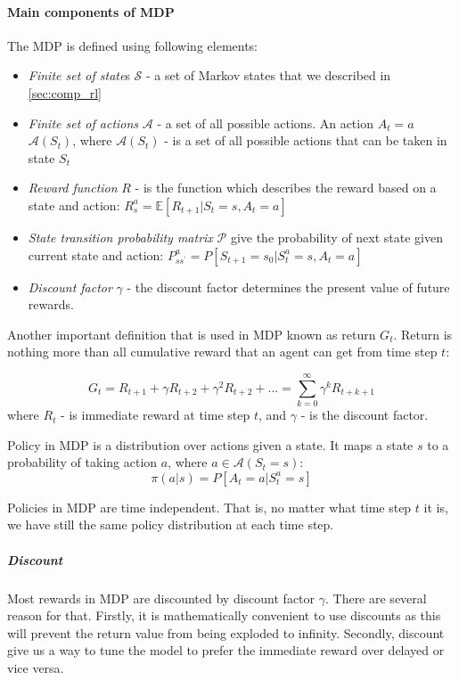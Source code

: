 \paragraph{Main components of MDP} The MDP is defined using following elements:
\begin{itemize}
	\item \emph{Finite set of state}s $\mathcal{S}$ - a set of Markov states that we described in \autoref{sec:comp_rl}
	\item \emph{Finite set of actions} $\mathcal{A}$ - a set of all possible actions.
		An action $A_t = a$ \in $\mathcal{A}(S_t)$, where $\mathcal{A}(S_t)$ -
		is a set of all possible actions that can be taken in state $S_t$
	\item \emph{Reward function} $R$ - is the function which describes
		the reward based on a state and action: $R_s^a = \mathbb{E}[R_{t+1}| S_t = s, A_t = a]$
	\item \emph{State transition probability matrix} $\mathcal{P}$ give
		the probability of next state given current state and action: $P^a_{ss^{\prime}} = P[S_{t+1} = s_0 | S_t^a = s, A_t = a]$
	\item \emph{Discount factor} $\gamma$ - the discount factor determines the present value
	 	of future rewards.
\end{itemize}

Another important definition that is used in MDP known as return $G_t$. Return is nothing
more than all cumulative reward that an agent can get from time step $t$:

\begin{equation} \label{eq:return}
	G_t = R_{t+1} + \gamma R_{t+2} + \gamma^2 R_{t+2} + ... = \sum_{k=0}^{\infty} \gamma^k R_{t+k+1}
\end{equation}
where $R_t$ - is immediate reward at time step $t$,
and $\gamma$ - is the discount factor.

Policy in MDP is a distribution over actions given a state.
It maps a state $s$ to a probability of taking action $a$, where $a \in \mathcal{A}(S_t = s)$:
\begin{equation}
	\pi(a|s) = P[A_t = a|S_t^a = s]
\end{equation}

Policies in MDP are time independent. That is, no matter what time step $t$ it is, we have still the same
policy distribution at each time step.

\subparagraph{Discount} Most rewards in MDP are discounted by discount factor $\gamma$.
There are several reason for that. Firstly, it is mathematically convenient
to use discounts as this will prevent the return value from being exploded to infinity.
Secondly, discount give us a way to tune the model to prefer the immediate reward over
delayed or vice versa.
